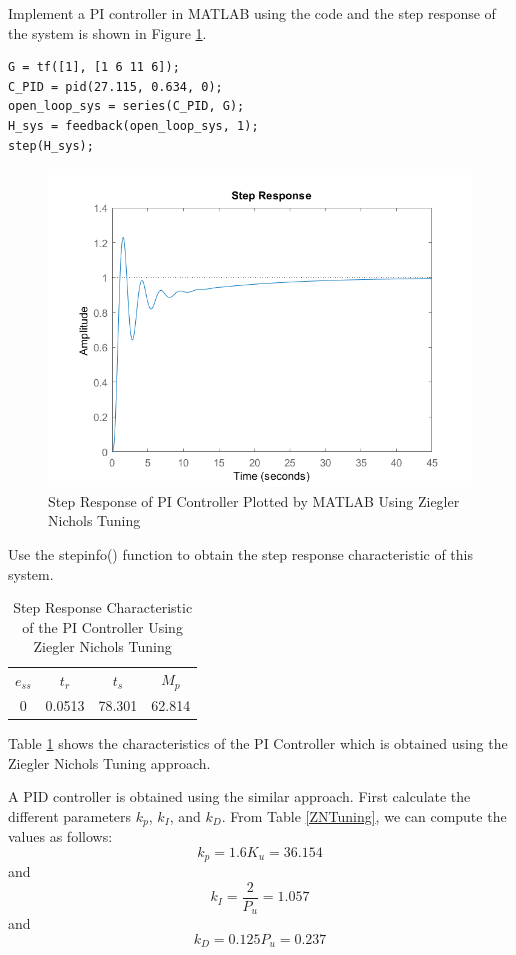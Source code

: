 \documentclass[a4paper, twocolumn, titlepage, 10pt]{article}
\begin{document}
	Implement a PI controller in MATLAB using the code and the step response of the system is shown in Figure \ref{step_pi_zn}.
	\begin{lstlisting}[frame=single, numbers=none]
G = tf([1], [1 6 11 6]);
C_PID = pid(27.115, 0.634, 0);
open_loop_sys = series(C_PID, G);
H_sys = feedback(open_loop_sys, 1);
step(H_sys);
	\end{lstlisting}
	\begin{figure}[H]
		\centering
		\includegraphics[width=\linewidth]{Step_PI_ZN}
		\caption{Step Response of PI Controller Plotted by MATLAB Using Ziegler Nichols Tuning}
		\label{step_pi_zn}
	\end{figure}
	
	Use the stepinfo() function to obtain the step response characteristic of this system.
	\begin{table}[H]
		\centering
		\begin{tabular}{c c c c}
			$e_{ss}$ & $t_r$ & $t_s$ & $M_p$ \\
			0 & 0.0513 & 78.301 & 62.814
		\end{tabular}
		\caption{Step Response Characteristic of the PI Controller Using Ziegler Nichols Tuning}
		\label{steptable_pi_zn}
	\end{table}
	Table \ref{steptable_pi_zn} shows the characteristics of the PI Controller which is obtained using the Ziegler Nichols Tuning approach. 
	
	A PID controller is obtained using the similar approach. First calculate the different parameters $k_p$, $k_I$, and $k_D$. From Table \ref{ZNTuning}, we can compute the values as follows:
	$$
		k_p = 1.6K_u = 36.154
	$$
	and
	$$
		k_I = \frac{2}{P_u} = 1.057
	$$
	and
	$$
		k_D = 0.125P_u = 0.237
	$$
	
\end{document}
